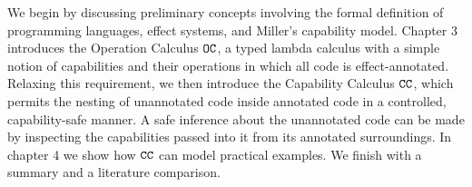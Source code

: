 We begin by discussing preliminary concepts involving the formal definition of programming languages, effect systems, and Miller's capability model. Chapter 3 introduces the Operation Calculus $\mathtt{OC}$, a typed lambda calculus with a simple notion of capabilities and their operations in which all code is effect-annotated. Relaxing this requirement, we then introduce the Capability Calculus $\mathtt{CC}$, which permits the nesting of unannotated code inside annotated code in a controlled, capability-safe manner. A safe inference about the unannotated code can be made by inspecting the capabilities passed into it from its annotated surroundings. In chapter 4 we show how $\mathtt{CC}$ can model practical examples. We finish with a summary and a literature comparison.



